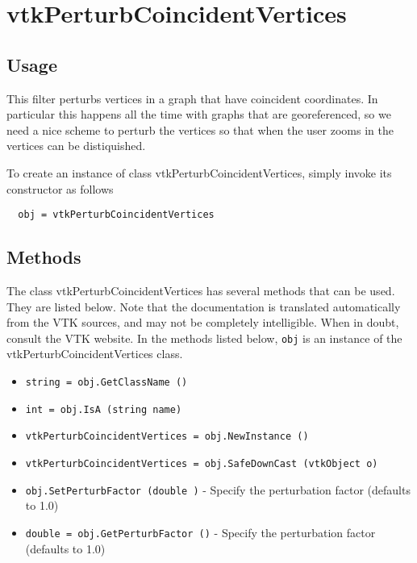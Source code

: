 \section{vtkPerturbCoincidentVertices}

\subsection{Usage}

 This filter perturbs vertices in a graph that have coincident coordinates.
 In particular this happens all the time with graphs that are georeferenced,
 so we need a nice scheme to perturb the vertices so that when the user
 zooms in the vertices can be distiquished.

To create an instance of class vtkPerturbCoincidentVertices, simply
invoke its constructor as follows
\begin{verbatim}
  obj = vtkPerturbCoincidentVertices
\end{verbatim}
\subsection{Methods}

The class vtkPerturbCoincidentVertices has several methods that can be used.
  They are listed below.
Note that the documentation is translated automatically from the VTK sources,
and may not be completely intelligible.  When in doubt, consult the VTK website.
In the methods listed below, \verb|obj| is an instance of the vtkPerturbCoincidentVertices class.
\begin{itemize}
\item  \verb|string = obj.GetClassName ()|

\item  \verb|int = obj.IsA (string name)|

\item  \verb|vtkPerturbCoincidentVertices = obj.NewInstance ()|

\item  \verb|vtkPerturbCoincidentVertices = obj.SafeDownCast (vtkObject o)|

\item  \verb|obj.SetPerturbFactor (double )| -  Specify the perturbation factor (defaults to 1.0)

\item  \verb|double = obj.GetPerturbFactor ()| -  Specify the perturbation factor (defaults to 1.0)

\end{itemize}

